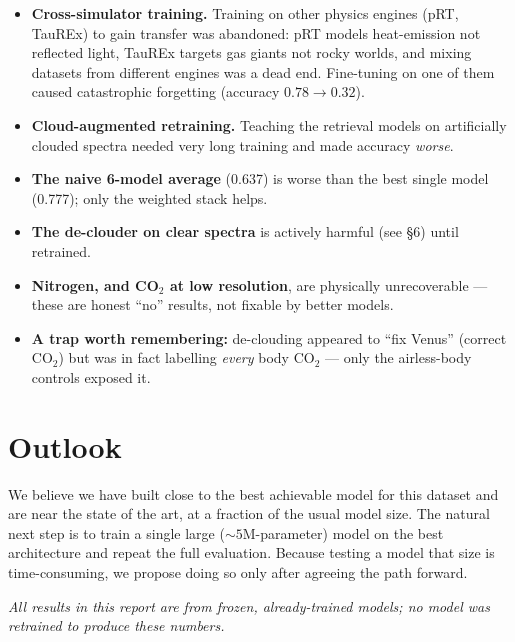 \documentclass[11pt]{article}
\begin{document}
\begin{itemize}[leftmargin=1.4em]
\item \textbf{Cross-simulator training.} Training on other physics engines (pRT, TauREx) to
gain transfer was abandoned: pRT models heat-emission not reflected light, TauREx targets gas
giants not rocky worlds, and mixing datasets from different engines was a dead end. Fine-tuning
on one of them caused catastrophic forgetting (accuracy $0.78 \rightarrow 0.32$).
\item \textbf{Cloud-augmented retraining.} Teaching the retrieval models on artificially
clouded spectra needed very long training and made accuracy \emph{worse}.
\item \textbf{The naive 6-model average} (0.637) is worse than the best single model (0.777);
only the weighted stack helps.
\item \textbf{The de-clouder on clear spectra} is actively harmful (see \S6) until retrained.
\item \textbf{Nitrogen, and CO$_2$ at low resolution}, are physically unrecoverable --- these
are honest ``no'' results, not fixable by better models.
\item \textbf{A trap worth remembering:} de-clouding appeared to ``fix Venus'' (correct CO$_2$)
but was in fact labelling \emph{every} body CO$_2$ --- only the airless-body controls exposed
it.
\end{itemize}

\section{Outlook}

We believe we have built close to the best achievable model for this dataset and are near the
state of the art, at a fraction of the usual model size. The natural next step is to train a
single large ($\sim 5$M-parameter) model on the best architecture and repeat the full
evaluation. Because testing a model that size is time-consuming, we propose doing so only after
agreeing the path forward.

\medskip
\noindent\textit{All results in this report are from frozen, already-trained models; no model
was retrained to produce these numbers.}
\end{document}
